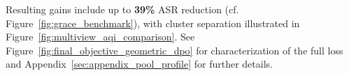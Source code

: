 Resulting gains include up to \textbf{39\%} ASR reduction (cf. Figure~\ref{fig:grace_benchmark}), with cluster separation illustrated in Figure~\ref{fig:multiview_aqi_comparison}. See Figure~\ref{fig:final_objective_geometric_dpo} for characterization of the full loss and Appendix~\ref{sec:appendix_pool_profile} for further details.










































